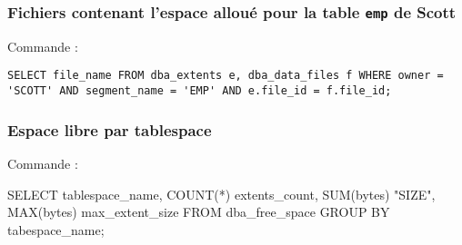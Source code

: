 \subsubsection{Fichiers contenant l'espace alloué pour la table \texttt{emp} de Scott}

Commande :
\begin{verbatim}
SELECT file_name FROM dba_extents e, dba_data_files f WHERE owner = 'SCOTT' AND segment_name = 'EMP' AND e.file_id = f.file_id;
\end{verbatim}

\subsubsection{Espace libre par tablespace}

Commande :
\begin{verbatimtab}
SELECT	tablespace_name,
	COUNT(*) extents_count,
	SUM(bytes) "SIZE",
	MAX(bytes) max_extent_size
FROM dba_free_space
GROUP BY tabespace_name;
\end{verbatimtab}